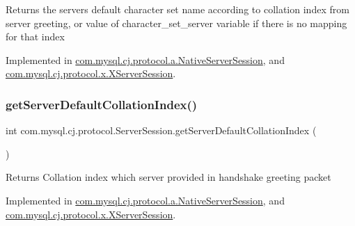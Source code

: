 \begin{DoxyReturn}{Returns}
the server\textquotesingle{}s default character set name according to collation index from server greeting, or value of \textquotesingle{}character\+\_\+set\+\_\+server\textquotesingle{} variable if there is no mapping for that index 
\end{DoxyReturn}


Implemented in \mbox{\hyperlink{classcom_1_1mysql_1_1cj_1_1protocol_1_1a_1_1_native_server_session_ad663008943ab8a1188490e3ba0befe95}{com.\+mysql.\+cj.\+protocol.\+a.\+Native\+Server\+Session}}, and \mbox{\hyperlink{classcom_1_1mysql_1_1cj_1_1protocol_1_1x_1_1_x_server_session_a7258b06a9876fde6f4ca0726a8fff500}{com.\+mysql.\+cj.\+protocol.\+x.\+X\+Server\+Session}}.

\mbox{\label{interfacecom_1_1mysql_1_1cj_1_1protocol_1_1_server_session_a840bf74b75252459afd6b33ae21c8379}} 
\subsubsection{\texorpdfstring{get\+Server\+Default\+Collation\+Index()}{getServerDefaultCollationIndex()}}
{\footnotesize\ttfamily int com.\+mysql.\+cj.\+protocol.\+Server\+Session.\+get\+Server\+Default\+Collation\+Index (\begin{DoxyParamCaption}{ }\end{DoxyParamCaption})}

\begin{DoxyReturn}{Returns}
Collation index which server provided in handshake greeting packet 
\end{DoxyReturn}


Implemented in \mbox{\hyperlink{classcom_1_1mysql_1_1cj_1_1protocol_1_1a_1_1_native_server_session_aeaccfa02aeae2a872f2d92412a051de0}{com.\+mysql.\+cj.\+protocol.\+a.\+Native\+Server\+Session}}, and \mbox{\hyperlink{classcom_1_1mysql_1_1cj_1_1protocol_1_1x_1_1_x_server_session_abbcbd0f1d4c0c4fab564b3ce8083ecf7}{com.\+mysql.\+cj.\+protocol.\+x.\+X\+Server\+Session}}.

